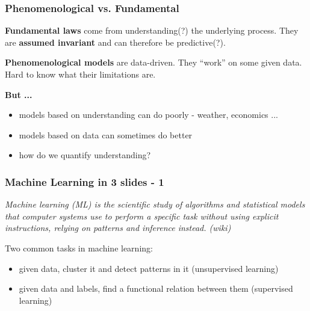 \documentclass[12pt,fleqn]{beamer}
\begin{document}
\begin{frame}\frametitle{Phenomenological vs. Fundamental}

\textbf{Fundamental laws} come from understanding(?) the underlying process.
They are {\bf assumed invariant} and can therefore be predictive(?).

\bigskip

\textbf{Phenomenological models} are data-driven. They ``work'' on some given data.
Hard to know what their limitations are.

\bigskip

{\bf But ...}
\begin{itemize}
\item models based on understanding can do poorly - weather, economics ...
\item models based on data can sometimes do better
\item how do we quantify understanding?
\end{itemize}

\end{frame}

\begin{frame}\frametitle{Machine Learning in 3 slides - 1}

{\em Machine learning (ML) is the scientific study of algorithms and statistical models that computer systems use to perform a specific task without using explicit instructions, relying on patterns and inference instead. (wiki)}

\bigskip\pause

Two common tasks in machine learning:
\begin{itemize}
\item given data, cluster it and detect patterns in it (unsupervised learning)
\item given data and labels, find a functional relation between them (supervised learning)
\end{itemize}



\end{frame}
\end{document}
